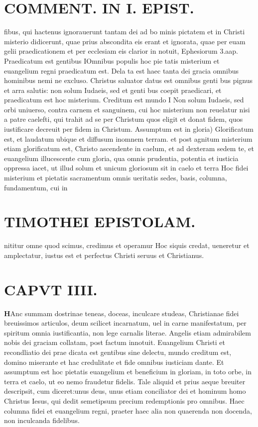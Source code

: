 \documentclass{article}
\begin{document}
\begin{pages}
\section*{COMMENT. IN I. EPIST. }
\marginpar{[ p.92 ]}\pstart fibus, qui hactenus ignorauerunt tantam dei ad bo minis pictatem et in Christi misterio didicerunt, quae prius abscondita eis erant et ignorata, quae per euam gelii praedicationem et per ecclesiam eis clarior in notuit, Ephesiorum 3.aap.  \pend\pstart Praedicatum est gentibus IOmnibus populis hoc pie tatis misterium et euangelium regni praedicatum est. Dela ta est haec tanta dei gracia omnibus hominibus nemi ne excluso. Christus saluator datus est omnibus genti bus pignus et arra salutis: non solum Iudaeis, sed et genti bus coepit praedicari, et praedicatum est hoc misterium.  \pend\pstart Creditum est mundo I Non solum Iudaeis, sed orbi uniuerso, contra carnem et sanguinem, cui hoc misterium non reuelatur nisi a patre caelefti, qui trahit ad se per Christum quos eligit et donat fidem, quos iustificare decreuit per fidem in Christum.  \pend\pstart Assumptum est in gloria) Glorificatum est, et laudatum ubique et diffusum inomnem terram. et post agnitum misterium etiam glorificatum est, Christo ascendente in caelum, et ad dexteram sedem te, et euangelium illucescente cum gloria, qua omnis prudentia, potentia et iusticia oppressa iacet, ut illud solum et unicum gloriosum sit in caelo et terra Hoc fidei misterium et pietatis sacramentum omnis ueritatis sedes, basis, columna, fundamentum, cui in\pend
\section*{TIMOTHEI EPISTOLAM. }
\marginpar{[ p.93 ]}\pstart nititur omne quod scimus, credimus et operamur Hoc siquis credat, ueneretur et amplectatur, iustus est et perfectus Christi seruus et Christianus.  \pend
\endnumbering\beginnumbering\section{CAPVT IIII.}\pstart \huge\textbf{H}\normalsize Anc summam dostrinae teneas, doceas, inculcare studeas, Christianae fidei breuissimos articulos, deum scilicet incarnatum, uel in carne manifestatum, per spiritum omnia iustificantia, non lege carnalis literae. Angelis etiam admirabilem nobis dei graciam collatam, post factum innotuit. Euangelium Christi et recondliatio dei prae dicata est gentibus sine delectu, mundo creditum est, domino miserante et hac credulitate et fide omnibus iusticiam dante. Et assumptum est hoc pietatis euangelium et beneficium in gloriam, in toto orbe, in terra et caelo, ut eo nemo fraudetur fidelis. Tale aliquid et prius aeque breuiter descripsit, cum diceret:unus deus, unus etiam conciliator dei et hominum homo Christus Iesus, qui dedit semetipsum precium redemptionis pro omnibus. Haec columna fidei et euangelium regni, praeter haec alia non quaerenda non docenda, non inculcanda fidelibus.  \pend
{}
{}

\end{pages}
\end{document}
